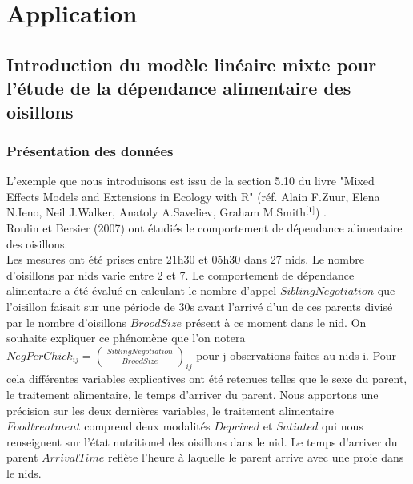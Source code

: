 \documentclass[12pt,fleqn]{book} %
\begin{document}
\newpage



\chapter{Application}


\section{Introduction du modèle linéaire mixte pour l'étude de la dépendance alimentaire des oisillons}

\vspace{2em}

\subsection{Présentation des données}

\vspace{1em}

L'exemple que nous introduisons est issu de la section 5.10 du livre "Mixed Effects Models and Extensions in Ecology with R" (réf. Alain F.Zuur, Elena N.Ieno, Neil J.Walker, Anatoly A.Saveliev, Graham M.Smith$^{\textbf{[1]}}$) .\\ 
Roulin et Bersier (2007) ont étudiés le comportement de dépendance alimentaire des oisillons.\\
Les mesures ont été prises entre 21h30 et 05h30 dans 27 nids. Le nombre d'oisillons par nids varie entre 2 et 7. Le comportement de dépendance alimentaire a été évalué en calculant le nombre d'appel $SiblingNegotiation$ que l'oisillon faisait sur une période de 30s avant l'arrivé d'un de ces parents divisé par le nombre d'oisillons $BroodSize$ présent à ce moment dans le nid. On souhaite expliquer ce phénomène que l'on notera $NegPerChick_{ij}=\left(\:\frac{SiblingNegotiation}{BroodSize}\:\right)_{ij}$ pour j observations faites au nids i. Pour cela différentes variables explicatives ont été retenues telles que le sexe du parent, le traitement alimentaire, le temps d'arriver du parent. Nous apportons une précision sur les deux dernières variables, le traitement alimentaire $Foodtreatment$ comprend deux modalités $Deprived$ et $Satiated$ qui nous renseignent sur l'état nutritionel des oisillons dans le nid. Le temps d'arriver du parent $ArrivalTime$  reflète l'heure à laquelle le parent arrive avec une proie dans le nids.
\end{document}
